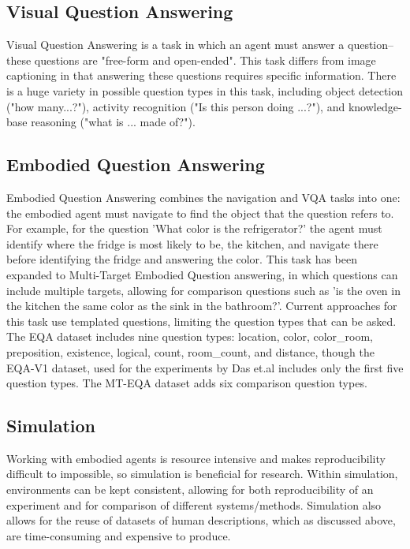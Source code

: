 \documentclass{article}
\begin{document}
\subsection{Visual Question Answering}
Visual Question Answering is a task in which an agent must answer a question--these questions are "free-form and open-ended"\cite{vqa_2015}. This task differs from image captioning in that answering these questions requires specific information. There is a huge variety in possible question types in this task, including object detection ("how many...?"), activity recognition ("Is this person doing ...?"), and knowledge-base reasoning ("what is ... made of?"). 

\subsection{Embodied Question Answering}
Embodied Question Answering combines the navigation and VQA tasks into one: the embodied agent must navigate to find the object that the question refers to\cite{embodiedqa}. For example, for the question 'What color is the refrigerator?' the agent must identify where the fridge is most likely to be, the kitchen, and navigate there before identifying the fridge and answering the color. This task has been expanded to Multi-Target Embodied Question answering, in which questions can include multiple targets, allowing for comparison questions such as 'is the oven in the kitchen the same color as the sink in the bathroom?'\cite{eqa_multitarget}. Current approaches for this task use templated questions, limiting the question types that can be asked. The EQA dataset includes nine question types: location, color, color\_room, preposition, existence, logical, count, room\_count, and distance, though the EQA-V1 dataset, used for the experiments by Das et.al includes only the first five question types\cite{embodiedqa}. The MT-EQA dataset adds six comparison question types\cite{eqa_multitarget}.


\subsection{Simulation}
Working with embodied agents is resource intensive and makes reproducibility difficult to impossible, so simulation is beneficial for research. Within simulation, environments can be kept consistent, allowing for both reproducibility of an experiment and for comparison of different systems/methods. Simulation also allows for the reuse of datasets of human descriptions, which as discussed above, are time-consuming and expensive to produce.  
\end{document}
